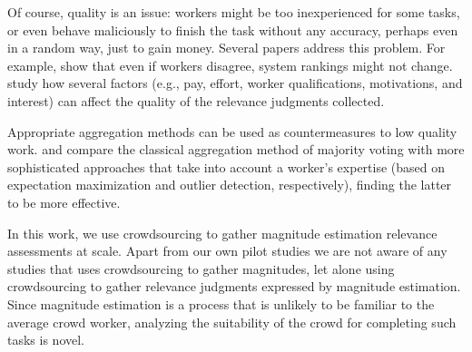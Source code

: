 Of course, quality is an issue: workers might be too inexperienced for
some tasks, or even behave maliciously to finish the task without any
accuracy, perhaps even in a random way, just to gain money. 
Several papers address this problem.
For example, \citet{Clough2013} show that even if workers disagree,
system rankings might not change. 
\citet{Kazai2013} study how several factors (e.g., pay, effort, worker
qualifications, motivations, and interest) can affect the quality of
the relevance judgments collected.

Appropriate aggregation methods can be used as countermeasures to low
quality work. 
\citet{Hosseini:2012} and \citet{Jung2011} compare the classical
aggregation method of majority voting with more sophisticated
approaches that take into account a worker's expertise (based on
expectation maximization and outlier detection, respectively), finding
the latter to be more effective. 


In this work, we use crowdsourcing to gather magnitude estimation
relevance assessments at scale.
Apart from our own pilot studies \citep{SchMad14,MadMiz15} we
are not aware of any studies that uses crowdsourcing to gather magnitudes,
let alone using crowdsourcing to gather relevance judgments expressed
by magnitude estimation.
Since magnitude estimation is a process that is unlikely to be familiar
to the average crowd worker, analyzing the suitability of the crowd for
completing such tasks is novel.



